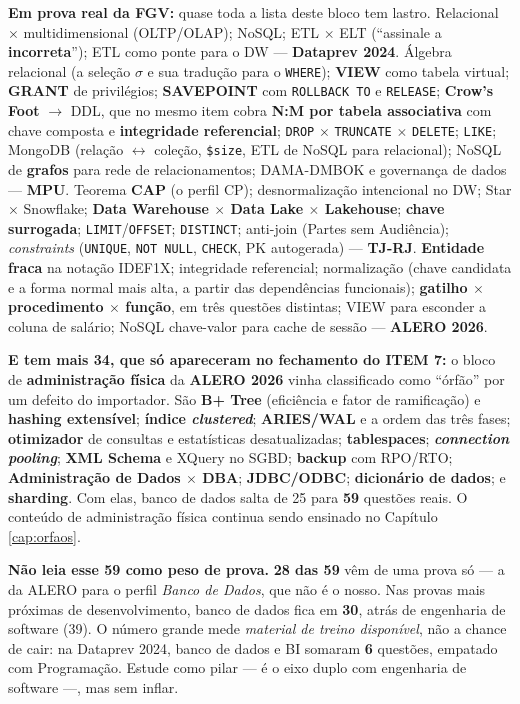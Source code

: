 \begin{jacaiu}
\textbf{Em prova real da FGV:} quase toda a lista deste bloco tem lastro.
Relacional $\times$ multidimensional (OLTP/OLAP); NoSQL; ETL $\times$ ELT
(``assinale a \textbf{incorreta}''); ETL como ponte para o DW ---
\textbf{Dataprev 2024}. Álgebra relacional (a seleção $\sigma$ e sua tradução
para o \texttt{WHERE}); \textbf{VIEW} como tabela virtual; \textbf{GRANT} de
privilégios; \textbf{SAVEPOINT} com \texttt{ROLLBACK TO} e
\texttt{RELEASE}; \textbf{Crow's Foot} $\to$ DDL, que no mesmo item cobra
\textbf{N:M por tabela associativa} com chave composta e \textbf{integridade
referencial}; \texttt{DROP} $\times$ \texttt{TRUNCATE} $\times$
\texttt{DELETE}; \texttt{LIKE}; MongoDB (relação $\leftrightarrow$ coleção,
\texttt{\$size}, ETL de NoSQL para relacional); NoSQL de \textbf{grafos} para
rede de relacionamentos; DAMA-DMBOK e governança de dados --- \textbf{MPU}.
Teorema \textbf{CAP} (o perfil CP); desnormalização intencional no DW; Star
$\times$ Snowflake; \textbf{Data Warehouse $\times$ Data Lake $\times$
Lakehouse}; \textbf{chave surrogada}; \texttt{LIMIT}/\texttt{OFFSET};
\texttt{DISTINCT}; anti-join (Partes sem Audiência); \emph{constraints}
(\texttt{UNIQUE}, \texttt{NOT NULL}, \texttt{CHECK}, PK autogerada) ---
\textbf{TJ-RJ}. \textbf{Entidade fraca} na notação IDEF1X; integridade
referencial; normalização (chave candidata e a forma normal mais alta, a
partir das dependências funcionais); \textbf{gatilho $\times$ procedimento
$\times$ função}, em três questões distintas; VIEW para esconder a coluna de
salário; NoSQL chave-valor para cache de sessão --- \textbf{ALERO 2026}.

\textbf{E tem mais 34, que só apareceram no fechamento do ITEM 7:} o bloco de
\textbf{administração física} da \textbf{ALERO 2026} vinha classificado como
``órfão'' por um defeito do importador. São \textbf{B+ Tree} (eficiência e
fator de ramificação) e \textbf{hashing extensível}; \textbf{índice
\emph{clustered}}; \textbf{ARIES/WAL} e a ordem das três fases;
\textbf{otimizador} de consultas e estatísticas desatualizadas;
\textbf{tablespaces}; \textbf{\emph{connection pooling}}; \textbf{XML Schema}
e XQuery no SGBD; \textbf{backup} com RPO/RTO; \textbf{Administração de Dados
$\times$ DBA}; \textbf{JDBC/ODBC}; \textbf{dicionário de dados}; e
\textbf{sharding}. Com elas, banco de dados salta de 25 para \textbf{59}
questões reais. O conteúdo de administração física continua sendo ensinado no
Capítulo \ref{cap:orfaos}.

\textbf{Não leia esse 59 como peso de prova.} \textbf{28 das 59} vêm de uma
prova só --- a da ALERO para o perfil \emph{Banco de Dados}, que não é o nosso.
Nas provas mais próximas de desenvolvimento, banco de dados fica em
\textbf{30}, atrás de engenharia de software (39). O número grande mede
\emph{material de treino disponível}, não a chance de cair: na Dataprev 2024,
banco de dados e BI somaram \textbf{6} questões, empatado com Programação.
Estude como pilar --- é o eixo duplo com engenharia de software ---, mas sem
inflar.


\end{jacaiu}

